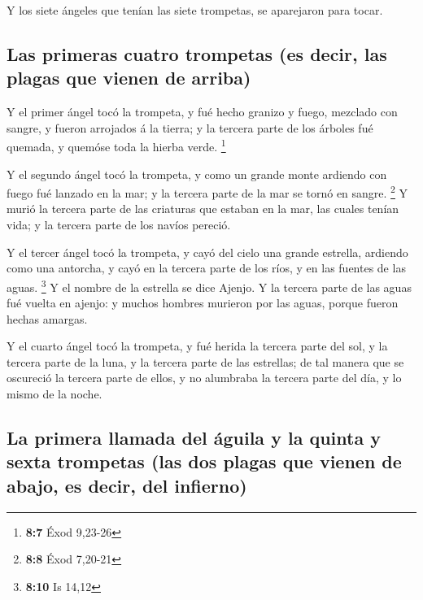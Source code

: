  Y los siete ángeles que tenían las siete trompetas, se
aparejaron para tocar.

\hypertarget{las-primeras-cuatro-trompetas-es-decir-las-plagas-que-vienen-de-arriba}{%
\subsection{Las primeras cuatro trompetas (es decir, las plagas que
vienen de
arriba)}\label{las-primeras-cuatro-trompetas-es-decir-las-plagas-que-vienen-de-arriba}}

 Y el primer ángel tocó la trompeta, y fué hecho granizo y
fuego, mezclado con sangre, y fueron arrojados á la tierra; y la tercera
parte de los árboles fué quemada, y quemóse toda la hierba verde.
\footnote{\textbf{8:7} Éxod 9,23-26}

 Y el segundo ángel tocó la trompeta, y como un grande
monte ardiendo con fuego fué lanzado en la mar; y la tercera parte de la
mar se tornó en sangre. \footnote{\textbf{8:8} Éxod 7,20-21}
 Y murió la tercera parte de las criaturas que estaban en
la mar, las cuales tenían vida; y la tercera parte de los navíos
pereció.

 Y el tercer ángel tocó la trompeta, y cayó del cielo una
grande estrella, ardiendo como una antorcha, y cayó en la tercera parte
de los ríos, y en las fuentes de las aguas. \footnote{\textbf{8:10} Is
  14,12}  Y el nombre de la estrella se dice Ajenjo. Y la
tercera parte de las aguas fué vuelta en ajenjo: y muchos hombres
murieron por las aguas, porque fueron hechas amargas.

 Y el cuarto ángel tocó la trompeta, y fué herida la
tercera parte del sol, y la tercera parte de la luna, y la tercera parte
de las estrellas; de tal manera que se oscureció la tercera parte de
ellos, y no alumbraba la tercera parte del día, y lo mismo de la noche.

\hypertarget{la-primera-llamada-del-uxe1guila-y-la-quinta-y-sexta-trompetas-las-dos-plagas-que-vienen-de-abajo-es-decir-del-infierno}{%
\subsection{La primera llamada del águila y la quinta y sexta trompetas
(las dos plagas que vienen de abajo, es decir, del
infierno)}\label{la-primera-llamada-del-uxe1guila-y-la-quinta-y-sexta-trompetas-las-dos-plagas-que-vienen-de-abajo-es-decir-del-infierno}}

